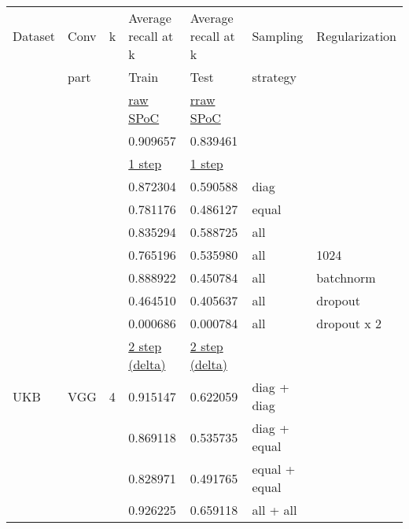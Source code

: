 \documentclass[a4paper,12pt]{extreport}
\begin{document}
    \begin{longtable}[h!]{|l|l|l|l|l|l|l|}
            \hline
            Dataset & Conv & k & Average recall at k & Average recall at k & Sampling & Regularization       \\
            & part & & Train & Test & strategy &                      \\ \hline
            & & & \underline{raw SPoC} & \underline{rraw SPoC}  & &                      \\
            & & & 0.909657 & 0.839461 & &                      \\ \cline{4-7}
            & & & \underline{1 step}   & \underline{1 step}   & &                      \\
            & & & 0.872304 & 0.590588 & diag &                      \\
            & & & 0.781176 & 0.486127 & equal &                      \\
            & & & 0.835294 & 0.588725 & all &                      \\
            & & & 0.765196 & 0.535980 & all & 1024 \\
            & & & 0.888922 & 0.450784 & all & batchnorm \\
            & & & 0.464510 & 0.405637 & all & dropout              \\
            & & & 0.000686 & 0.000784 & all & dropout x 2           \\\cline{4-7}
            & & & \underline{2 step (delta)} & \underline{2 step (delta)} & &                      \\
            UKB & VGG & 4 & 0.915147 & 0.622059 & diag + diag &                      \\
            & & & 0.869118 & 0.535735 & diag + equal &                      \\
            & & & 0.828971 & 0.491765 & equal + equal &                      \\
            & & & 0.926225 & 0.659118 & all + all &                      \\

\end{longtable}
\end{document}
